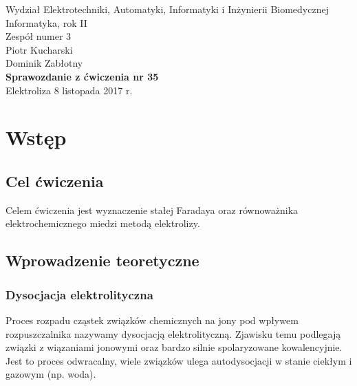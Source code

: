 \documentclass[a4paper,12pts]{article}
\begin{document}
	\thispagestyle{empty}
	\begin{flushleft}
		Wydział Elektrotechniki, Automatyki, Informatyki i Inżynierii Biomedycznej \\
		Informatyka, rok II \\
		Zespół numer 3 \\
		Piotr Kucharski \\
		Dominik Zabłotny \\
		\vspace*{\fill}
		{\large \textbf{Sprawozdanie z ćwiczenia nr 35} } \\
		Elektroliza		
		\vfill	
		8 listopada 2017 r.
	\end{flushleft}
	
	\newpage
	
	
	\section{Wstęp}
	
		\subsection{Cel ćwiczenia}
		Celem ćwiczenia jest wyznaczenie stałej Faradaya oraz równoważnika elektrochemicznego miedzi metodą elektrolizy.
	
	
		\subsection{Wprowadzenie teoretyczne}
	
			\subsubsection{Dysocjacja elektrolityczna}
			Proces rozpadu cząstek związków chemicznych na jony pod wpływem rozpuszczalnika nazywamy dysocjacją elektrolityczną. Zjawisku temu podlegają związki z wiązaniami jonowymi oraz bardzo silnie spolaryzowane kowalencyjnie. Jest to proces odwracalny, wiele związków ulega autodysocjacji w stanie ciekłym i gazowym (np. woda).
			
\end{document}
